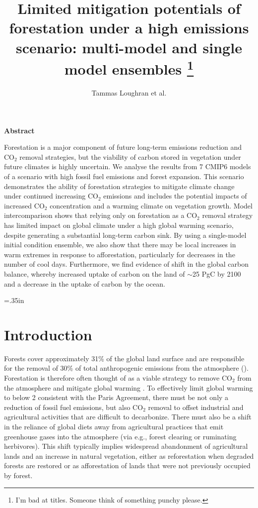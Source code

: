 \documentclass[]{article}
\title{Limited mitigation potentials of forestation under a high emissions scenario: multi-model and single model ensembles \footnote{I'm bad at titles. Someone think of something punchy please.}}
\author{Tammas Loughran et al.}
\begin{document}
\maketitle

\begin{center}
    \Large
    \vspace{0.9cm}
    \textbf{Abstract}
\end{center}

Forestation is a major component of future long-term emissions reduction and CO$_2$ removal strategies, but the viability of carbon stored in vegetation under future climates is highly uncertain.
We analyse the results from 7 CMIP6 models of a scenario with high fossil fuel emissions and forest expansion.
This scenario demonstrates the ability of forestation strategies to mitigate climate change under continued increasing CO$_2$ emissions and includes the potential impacts of increased CO$_2$ concentration and a warming climate on vegetation growth.
Model intercomparison shows that relying only on forestation as a CO$_2$ removal strategy has limited impact on global climate under a high global warming scenario, despite generating a substantial long-term carbon sink.
By using a single-model initial condition ensemble, we also show that there may be local increases in warm extremes in response to afforestation, particularly for decreases in the number of cool days.
Furthermore, we find evidence of shift in the global carbon balance, whereby increased uptake of carbon on the land of $\sim$25 PgC by 2100 and a decrease in the uptake of carbon by the ocean.

\raggedright
\parindent=.35in %

\section{Introduction}

Forests cover approximately 31\% of the global land surface \parencite{fao_global_2020} and are responsible for the removal of 30\% of total anthropogenic emissions from the atmosphere (\cite{friedlingstein_global_2022}).
Forestation is therefore often thought of as a viable strategy to remove CO$_2$ from the atmosphere and mitigate global warming \parencite{smith_long-term_2022}.
To effectively limit global warming to below 2 \textcelsius{} consistent with the Paris Agreement, there must be not only a reduction of fossil fuel emissions, but also CO$_2$ removal to offset industrial and agricultural activities that are difficult to decarbonize.
There must also be a shift in the reliance of global diets away from agricultural practices that emit greenhouse gases into the atmosphere (via e.g., forest clearing or ruminating herbivores).
This shift typically implies widespread abandonment of agricultural lands and an increase in natural vegetation, either as reforestation when degraded forests are restored or as afforestation of lands that were not previously occupied by forest.
\end{document}
